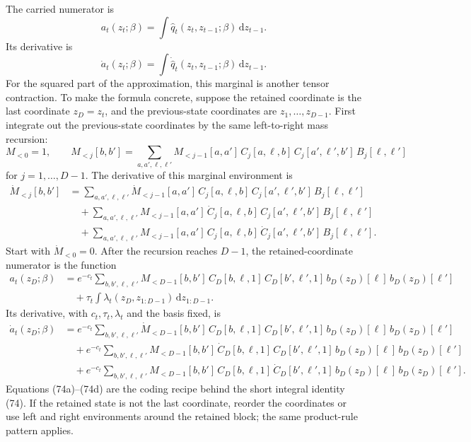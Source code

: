 \documentclass[11pt]{article}
\newcommand{\dd}{\,\mathrm d}
\begin{document}
The carried numerator is
\[
    a_t(z_t;\beta)
    =
    \int \widehat q_t(z_t,z_{t-1};\beta)\dd z_{t-1}.
    \tag{P19-73}
\]
Its derivative is
\[
    \dot a_t(z_t;\beta)
    =
    \int \dot{\widehat q}_t(z_t,z_{t-1};\beta)\dd z_{t-1}.
    \tag{P19-74}
\]
For the squared part of the approximation, this marginal is another tensor
contraction.  To make the formula concrete, suppose the retained coordinate is
the last coordinate \(z_D=z_t\), and the previous-state coordinates are
\(z_1,\ldots,z_{D-1}\).  First integrate out the previous-state coordinates by
the same left-to-right mass recursion:
\[
    M_{<0}=1,
    \qquad
    M_{<j}[b,b']
    =
    \sum_{a,a',\ell,\ell'}
    M_{<j-1}[a,a']\,
    C_j[a,\ell,b]\,
    C_j[a',\ell',b']\,
    B_j[\ell,\ell']
    \tag{P19-74a}
\]
for \(j=1,\ldots,D-1\).  The derivative of this marginal environment is
\[
\begin{aligned}
    \dot M_{<j}[b,b']
    &=
    \sum_{a,a',\ell,\ell'}
    \dot M_{<j-1}[a,a']\,
    C_j[a,\ell,b]\,
    C_j[a',\ell',b']\,
    B_j[\ell,\ell']\\
    &\quad+
    \sum_{a,a',\ell,\ell'}
    M_{<j-1}[a,a']\,
    \dot C_j[a,\ell,b]\,
    C_j[a',\ell',b']\,
    B_j[\ell,\ell']\\
    &\quad+
    \sum_{a,a',\ell,\ell'}
    M_{<j-1}[a,a']\,
    C_j[a,\ell,b]\,
    \dot C_j[a',\ell',b']\,
    B_j[\ell,\ell'].
\end{aligned}
    \tag{P19-74b}
\]
Start with \(\dot M_{<0}=0\).  After the recursion reaches \(D-1\), the
retained-coordinate numerator is the function
\[
\begin{aligned}
    a_t(z_D;\beta)
    &=
    e^{-c_t}
    \sum_{b,b',\ell,\ell'}
    M_{<D-1}[b,b']\,
    C_D[b,\ell,1]\,
    C_D[b',\ell',1]\,
    b_D(z_D)[\ell]\,
    b_D(z_D)[\ell']\\
    &\quad+
    \tau_t
    \int \lambda_t(z_D,z_{1:D-1})\dd z_{1:D-1}.
\end{aligned}
    \tag{P19-74c}
\]
Its derivative, with \(c_t,\tau_t,\lambda_t\) and the basis fixed, is
\[
\begin{aligned}
    \dot a_t(z_D;\beta)
    &=
    e^{-c_t}
    \sum_{b,b',\ell,\ell'}
    \dot M_{<D-1}[b,b']\,
    C_D[b,\ell,1]\,
    C_D[b',\ell',1]\,
    b_D(z_D)[\ell]\,
    b_D(z_D)[\ell']\\
    &\quad+
    e^{-c_t}
    \sum_{b,b',\ell,\ell'}
    M_{<D-1}[b,b']\,
    \dot C_D[b,\ell,1]\,
    C_D[b',\ell',1]\,
    b_D(z_D)[\ell]\,
    b_D(z_D)[\ell']\\
    &\quad+
    e^{-c_t}
    \sum_{b,b',\ell,\ell'}
    M_{<D-1}[b,b']\,
    C_D[b,\ell,1]\,
    \dot C_D[b',\ell',1]\,
    b_D(z_D)[\ell]\,
    b_D(z_D)[\ell'].
\end{aligned}
    \tag{P19-74d}
\]
Equations (74a)--(74d) are the coding recipe behind the short integral
identity (74).  If the retained state is not the last coordinate, reorder the
coordinates or use left and right environments around the retained block; the
same product-rule pattern applies.
\end{document}
